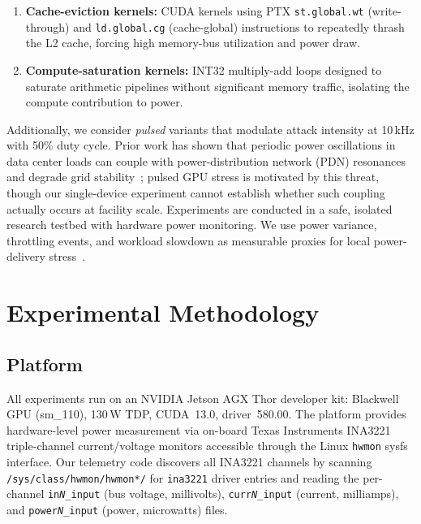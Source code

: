 \documentclass[conference]{IEEEtran}
\begin{document}
\begin{enumerate}
\item \textbf{Cache-eviction kernels:} CUDA kernels using PTX
  \texttt{st.global.wt} (write-through) and \texttt{ld.global.cg}
  (cache-global) instructions to repeatedly thrash the L2 cache,
  forcing high memory-bus utilization and power draw.
\item \textbf{Compute-saturation kernels:} INT32 multiply-add loops
  designed to saturate arithmetic pipelines without significant memory
  traffic, isolating the compute contribution to power.
\end{enumerate}

Additionally, we consider \emph{pulsed} variants that modulate attack
intensity at 10\,kHz with 50\% duty cycle.  Prior work has shown that
periodic power oscillations in data center loads can couple with
power-distribution network (PDN) resonances and degrade grid
stability~\cite{yandrofski2022}; pulsed GPU stress is motivated by
this threat, though our single-device experiment cannot establish
whether such coupling actually occurs at facility scale.  Experiments
are conducted in a safe, isolated research testbed with hardware power
monitoring.  We use power variance, throttling events, and workload
slowdown as measurable proxies for local power-delivery
stress~\cite{islam2017}.



\section{Experimental Methodology}
\label{sec:method}

\subsection{Platform}

All experiments run on an NVIDIA Jetson AGX Thor developer kit:
Blackwell GPU (sm\_110), 130\,W TDP, CUDA~13.0, driver~580.00.
The platform provides hardware-level power measurement via on-board
Texas Instruments INA3221 triple-channel current/voltage monitors
accessible through the Linux \texttt{hwmon} sysfs interface.
Our telemetry code discovers all INA3221 channels by scanning
\texttt{/sys/class/hwmon/hwmon*/} for \texttt{ina3221} driver entries
and reading the per-channel \texttt{in\textit{N}\_input} (bus voltage,
millivolts), \texttt{curr\textit{N}\_input} (current, milliamps), and
\texttt{power\textit{N}\_input} (power, microwatts) files.
\end{document}
